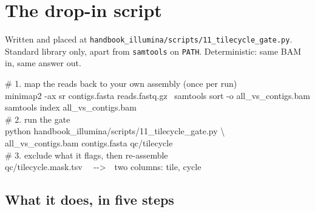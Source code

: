 \clearpage
\renewcommand{\sectioncolor}{ember}
\section{The drop-in script}

Written and placed at \texttt{handbook\_illumina/scripts/11\_tilecycle\_gate.py}. Standard library
only, apart from \texttt{samtools} on \texttt{PATH}. Deterministic: same BAM in, same answer out.

\begin{center}
\begin{tcolorbox}[enhanced,width=\textwidth,colback=ink,colframe=ember,boxrule=1pt,arc=3pt,
  fontupper=\ttfamily\scriptsize\color{white},left=9pt,right=9pt,top=8pt,bottom=8pt,
  title={\bfseries How to run it},fonttitle=\bfseries\small,coltitle=white,colbacktitle=ember]
\# 1. map the reads back to your own assembly (once per run)\\
minimap2 -ax sr contigs.fasta reads.fastq.gz \textbar\ samtools sort -o all\_vs\_contigs.bam\\
samtools index all\_vs\_contigs.bam\\[6pt]
\# 2. run the gate\\
python handbook\_illumina/scripts/11\_tilecycle\_gate.py \textbackslash\\
\hspace*{2em}all\_vs\_contigs.bam contigs.fasta qc/tilecycle\\[6pt]
\# 3. exclude what it flags, then re-assemble\\
\hspace*{1em}qc/tilecycle.mask.tsv \ \ -\/->\ \ two columns: tile, cycle
\end{tcolorbox}
\end{center}

\subsection{What it does, in five steps}

